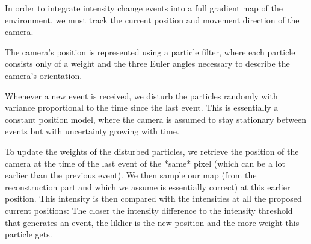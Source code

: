 In order to integrate intensity change events into a full gradient map of the
environment, we must track the current position and movement direction of the
camera.

The camera's position is represented using a particle filter, where each
particle consists only of a weight and the three Euler angles necessary to
describe the camera's orientation.

Whenever a new event is received, we disturb the particles randomly with
variance proportional to the time since the last event. This is essentially a
constant position model, where the camera is assumed to stay stationary between
events but with uncertainty growing with time.

To update the weights of the disturbed particles, we retrieve the position of
the camera at the time of the last event of the *same* pixel (which can be a
lot earlier than the previous event). We then sample our map (from the
reconstruction part and which we assume is essentially correct) at this earlier
position. This intensity is then compared with the intensities at all the
proposed current positions: The closer the intensity difference to the
intensity threshold that generates an event, the liklier is the new position
and the more weight this particle gets.
